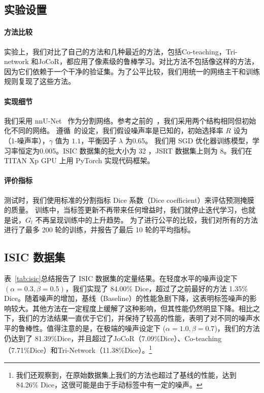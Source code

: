 \subsection{实验设置}
\paragraph{方法比较}
实验上，我们对比了自己的方法和几种最近的方法，包括Co-teaching\citep{Han2018CoteachingRT}，Tri-network\citep{Zhang2020RobustMI} 和JoCoR\citep{Wei2020CombatingNL}，都应用了像素级的鲁棒学习。对比方法不包括像\citet{ mirikharaji2019learning, Zhang2020CharacterizingLE}这样的方法，因为它们依赖于一个干净的验证集。为了公平比较，我们用统一的网络主干和训练规则复现了这些方法。

\paragraph{实现细节}
我们采用 nnU-Net~\cite{Isensee2020nnUNetAS} 作为分割网络。参考之前的~\citet{Malach2017DecouplingT}，我们采用两个结构相同但初始化不同的网络。
遵循~\citet{Han2018CoteachingRT}的设定，我们假设噪声率是已知的，初始选择率 $R$ 设为（1-噪声率），$\gamma$ 值为 $1.1$，平衡因子 $\lambda$ 为0.65。
我们用 SGD 优化器训练模型，学习率恒定为0.005。ISIC 数据集的批大小为 32 ，JSRT 数据集上则为 8。我们在 TITAN Xp GPU 上用 PyTorch 实现代码框架。

\paragraph{评价指标}
测试时，我们使用标准的分割指标 Dice 系数（Dice coefficient）来评估预测掩膜的质量。
训练中，当标签更新不再带来任何增益时，我们就停止迭代学习，也就是说，$G_l$ 不再呈现训练中的上升趋势。
为了进行公平的比较，我们对所有的方法进行了最多 200 轮的训练，并报告了最后 10 轮的平均指标。

\subsection{ISIC 数据集}

表~\ref{tab:isic}总结报告了 ISIC 数据集的定量结果。在轻度水平的噪声设定下 $(\alpha=0.3, \beta=0.5)$，我们实现了 84.00\% Dice，超过了之前最好的方法 1.35\% Dice。随着噪声的增加，基线（Baseline）的性能急剧下降，这表明标签噪声的影响较大。其他方法在一定程度上缓解了这种影响，但其性能仍然明显下降。相比之下，我们的方法结果一直优于它们，并保持了较高的性能，表明了对不同的噪声水平的鲁棒性。值得注意的是，在极端的噪声设定下 ($\alpha=1.0, \beta=0.7$)，我们的方法仍达到了 81.39\%Dice，并且超过了JoCoR（7.09\%Dice）、Co-teaching（7.71\%Dice）和Tri-Network（11.38\%Dice）。\footnote{我们还观察到，在原始数据集上我们的方法也超过了基线的性能，达到 84.26\% Dice，这很可能是由于手动标签中有一定的噪声。}

